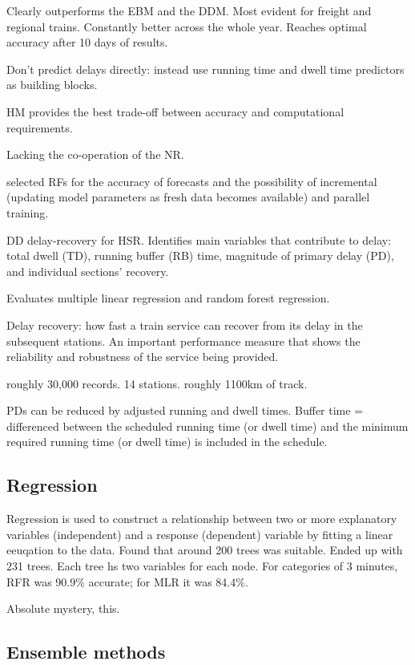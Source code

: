 \documentclass{article}
\begin{document}
Clearly outperforms the EBM and the DDM. Most evident for freight and regional trains. Constantly better across the whole year. Reaches optimal accuracy after 10 days of results.

Don't predict delays directly: instead use running time and dwell time predictors as building blocks. 

HM provides the best trade-off between accuracy and computational requirements. 

Lacking the co-operation of the NR. 

\cite{nair_et_al_2019} selected RFs for the accuracy of forecasts and the possibility of incremental (updating model parameters as fresh data becomes available) and parallel training. 

\cite{wen_et_al_2017} DD delay-recovery for HSR. Identifies main variables that contribute to delay: total dwell (TD), running buffer (RB) time, magnitude of primary delay (PD), and individual sections' recovery.

Evaluates multiple linear regression and random forest regression. 

Delay recovery: how fast a train service can recover from its delay in the subsequent stations. An important performance measure that shows the reliability and robustness of the service being provided. 

roughly 30,000 records. 14 stations. roughly 1100km of track. 

PDs can be reduced by adjusted running and dwell times. Buffer time = differenced between the scheduled running time (or dwell time) and the minimum required running time (or dwell time) is included in the schedule.

\subsection{Regression}

Regression is used to construct a relationship between two or more explanatory variables (independent) and a response (dependent) variable by fitting a linear eeuqation to the data. 
Found that around 200 trees was suitable. Ended up with 231 trees. Each tree hs two variables for each node.  For categories of 3 minutes, RFR was 90.9\% accurate; for MLR it was 84.4\%. 

Absolute mystery, this. 


\subsection{Ensemble methods}
\end{document}
